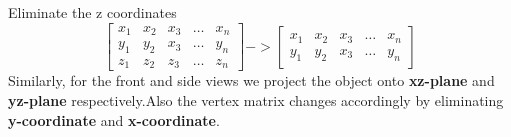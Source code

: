     Eliminate the z coordinates 
    $$ 
    \begin{bmatrix}
    x_{1}       & x_{2} & x_{3} & \dots & x_{n} \\
    y_{1}       & y_{2} & x_{3} & \dots & y_{n} \\
    z_{1}       & z_{2} & z_{3} & \dots & z_{n}
\end{bmatrix}
  -> \begin{bmatrix}
    x_{1}       & x_{2} & x_{3} & \dots & x_{n} \\
    y_{1}       & y_{2} & x_{3} & \dots & y_{n}
    \end{bmatrix}
    $$
Similarly, for the front and side views we project the object onto \textbf{xz-plane} and \textbf{yz-plane} respectively.Also the vertex matrix changes accordingly by eliminating \textbf{y-coordinate} and \textbf{x-coordinate}.\\
